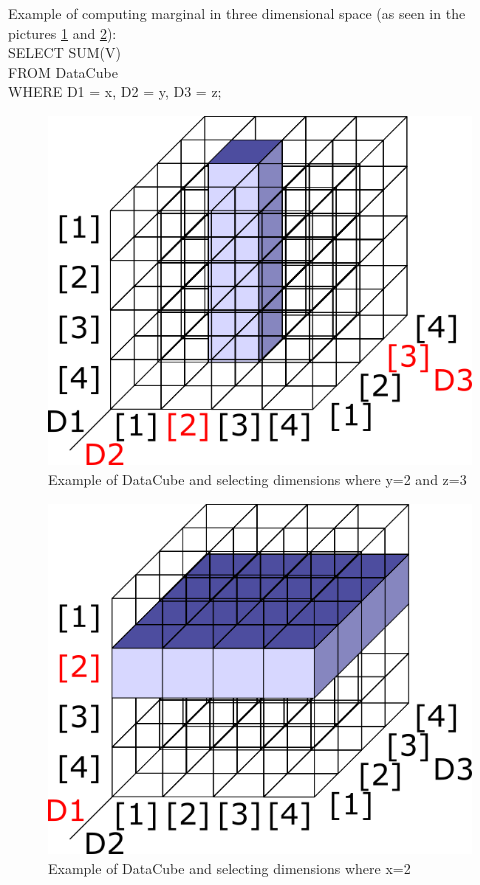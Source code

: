 Example of computing marginal in three dimensional space (as seen in the pictures \ref{margin1} and \ref{margin2}):\\
SELECT SUM(V) \\
FROM DataCube \\
WHERE D1 = x, D2 = y, D3 = z;\\
\begin{figure}
\centering
\includegraphics[scale=0.5]{marg1d.png}
\caption{Example of DataCube and selecting dimensions where y=2 and z=3}
\label{margin1}
\end{figure}
\begin{figure}
\centering
\includegraphics[scale=0.5]{marg2d.png}
\caption{Example of DataCube and selecting dimensions where x=2}
\label{margin2}
\end{figure}


